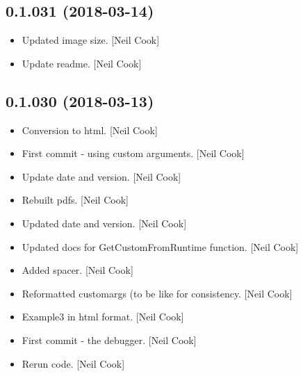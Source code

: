 \documentclass[a4paper,10pt,english]{report}
\begin{document}
\subsection{0.1.031 (2018-03-14)}
\label{\detokenize{misc/changelog:id472}}\begin{itemize}
\item {} 
Updated image size. {[}Neil Cook{]}

\item {} 
Update readme. {[}Neil Cook{]}

\end{itemize}


\subsection{0.1.030 (2018-03-13)}
\label{\detokenize{misc/changelog:id473}}\begin{itemize}
\item {} 
Conversion to html. {[}Neil Cook{]}

\item {} 
First commit - using custom arguments. {[}Neil Cook{]}

\item {} 
Update date and version. {[}Neil Cook{]}

\item {} 
Rebuilt pdfs. {[}Neil Cook{]}

\item {} 
Updated date and version. {[}Neil Cook{]}

\item {} 
Updated docs for GetCustomFromRuntime function. {[}Neil Cook{]}

\item {} 
Added spacer. {[}Neil Cook{]}

\item {} 
Reformatted customargs (to be like  for consistency. {[}Neil
Cook{]}

\item {} 
Example3 in html format. {[}Neil Cook{]}

\item {} 
First commit - the debugger. {[}Neil Cook{]}

\item {} 
Rerun code. {[}Neil Cook{]}

\end{itemize}
\end{document}
